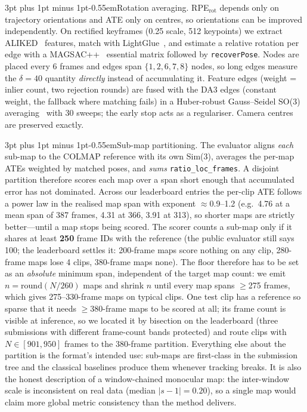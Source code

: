 \documentclass[10pt,a4paper]{article}
\makeatletter
\renewcommand\paragraph{\@startsection{paragraph}{4}{\z@}%
  {3pt plus 1pt minus 1pt}{-0.55em}{\normalfont\bfseries}}
\makeatother
\begin{document}
\paragraph{Rotation averaging.}
RPE$_{\text{rot}}$ depends only on trajectory orientations and ATE only on centres, so orientations can
be improved independently. On rectified keyframes (0.25 scale, 512 keypoints) we extract
ALIKED~\cite{aliked} features, match with LightGlue~\cite{lightglue}, and estimate a relative rotation
per edge with a MAGSAC++~\cite{magsac} essential matrix followed by \texttt{recoverPose}. Nodes are
placed every 6 frames and edges span $\{1,2,6,7,8\}$ nodes, so long edges measure the $\delta=40$
quantity \emph{directly} instead of accumulating it. Feature edges (weight = inlier count, two
rejection rounds) are fused with the DA3 edges (constant weight, the fallback where matching fails)
in a Huber-robust Gauss--Seidel SO(3) averaging~\cite{rotavg} with 30 sweeps; the early stop acts as a
regulariser. Camera centres are preserved exactly.

\paragraph{Sub-map partitioning.}
The evaluator aligns \emph{each} sub-map to the COLMAP reference with its own Sim(3), averages the
per-map ATEs weighted by matched poses, and \emph{sums} \texttt{ratio\_loc\_frames}. A disjoint
partition therefore scores each map over a span short enough that accumulated error has not
dominated. Across our leaderboard entries the per-clip ATE follows a power law in the realised map
span with exponent $\approx$0.9--1.2 (e.g.\ 4.76 at a mean span of 387 frames, 4.31 at 366,
3.91 at 313), so shorter maps are strictly better---until a map stops being scored. The scorer
counts a sub-map only if it shares at least \textbf{250} frame IDs with the reference (the
public evaluator still says 100; the leaderboard settles it: 200-frame maps score nothing on any
clip, 280-frame maps lose 4 clips, 380-frame maps none). The floor therefore has to be set as an
\emph{absolute} minimum span, independent of the target map count: we emit
$n=\mathrm{round}(N/260)$ maps and shrink $n$ until every map spans $\geq$275 frames, which gives
275--330-frame maps on typical clips. One test clip has a reference so sparse that it needs
$\geq$380-frame maps to be scored at all; its frame count is visible at inference, so we located it
by bisection on the leaderboard (three submissions with different frame-count bands protected) and
route clips with $N\in[901,950]$ frames to the 380-frame partition. Everything else about the
partition is the format's intended use: sub-maps are first-class in the submission tree and the
classical baselines produce them whenever tracking breaks. It is also the honest description of a
window-chained monocular map: the inter-window scale is inconsistent on real data (median
$|s-1|=0.20$), so a single map would claim more global metric consistency than the method delivers.
\end{document}
